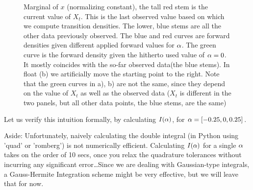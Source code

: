 \documentclass{article}
\begin{document}
\begin{figure}[htp]
\begin{center}
  \caption[labelInTOC]{
  Marginal of $x$ (normalizing constant), the tall red stem
  is the current value of $X_t$. This is the last observed value based on
  which we compute transition densities. The lower, blue stems are all the
  other data previously observed. The blue and red curves are forward densities
  given different applied forward values for ${\alpha}$. The green curve is the forward density given the hitherto used value of ${\alpha}=0$. It mostly coincides
  with the so-far observed data(the blue stems).
  In float (b) we artificially move the starting point to the right. Note that
  the green curves in a), b) are not the same, since they depend on the value
  of $X_t$ as well as the observed data ($X_t$ is different in the two
  panels, but all other data points, the blue stems, are the same)}
\end{center}
\end{figure}

Let us verify this intuition formally, by calculating $I({\alpha})$, for ${\alpha} =[-0.25 , 0, 0.25]$.

Aside: Unfortunately, naively calculating the double integral (in Python using
'quad' or 'romberg') is not numerically efficient. Calculating $I({\alpha})$ for a
single ${\alpha}$ takes on the order of 10 secs, once you relax the quadrature
tolerances without incurring any significant error\ldots Since we are dealing
with Gaussian-type integrals, a Gauss-Hermite Integration scheme might be very
effective, but we will leave that for now.
\end{document}
